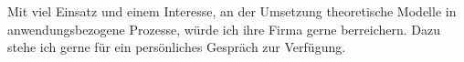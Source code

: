 \documentclass[11pt, a4paper]{Awesome-CV/awesome-cv}
\begin{document}
\begin{cvletter}
Mit viel Einsatz und einem Interesse,
an der Umsetzung theoretische Modelle in anwendungsbezogene Prozesse,
würde ich ihre Firma gerne berreichern.
Dazu stehe ich gerne für ein persönliches Gespräch zur Verfügung.





\end{cvletter}


\makeletterclosing
\end{document}
